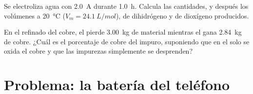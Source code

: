 \begin{exercise}[$\star\star\star$]\label{exo:g12:cells-and-electrolysis:14}
Se electroliza agua con \qty{2.0}{A} durante \qty{1.0}{h}. Calcula las
cantidades, y después los volúmenes a \qty{20}{\celsius}
($V_m = \qty{24.1}{L/mol}$), de dihidrógeno y de dioxígeno producidos.
\end{exercise}

\begin{exercise}[$\star\star\star$]\label{exo:g12:cells-and-electrolysis:15}
En el refinado del cobre, el  pierde \qty{3.00}{kg} de material
mientras el  gana \qty{2.84}{kg} de cobre. ¿Cuál es el porcentaje
de cobre del  impuro, suponiendo que en el  solo se oxida el
cobre y que las impurezas simplemente se desprenden?
\end{exercise}

\section{Problema: la batería del teléfono}

